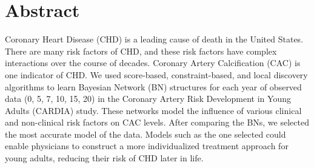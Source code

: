 \section{Abstract}
\begin{comment}


We created a Bayesian Network that models and tracks human behavior.  The data set that we used consists of health records from 5,115 black and white, males and females, ages 18-30, called CARDIA data.\cite{Friedman1988}  Using the CARDIA data we were able to track behavioral changes amongst patients, through the implementation of our Bayesian Network.  Our Network then, modeled these changes and made statistical inferences based off different attributes within our network.  These inferences can aid physicians in building a patient specific decision support model. Hospitals can then use these decision support models to produce a more personalized medical approach for treating their patients.
\end{comment}


Coronary Heart Disease (CHD) is a leading cause of death in the United States. There are many risk factors of CHD, and these risk factors have complex interactions over the course of decades. Coronary Artery Calcification (CAC) is one indicator of CHD. We used score-based, constraint-based, and local discovery algorithms to learn Bayesian Network (BN) structures for each year of observed data (0, 5, 7, 10, 15, 20) in the Coronary Artery Risk Development in Young Adults (CARDIA) study. These networks model the influence of various clinical and non-clinical risk factors on CAC levels. After comparing the BNs, we selected the most accurate model of the data. Models such as the one selected could enable physicians to construct a more individualized treatment approach for young adults, reducing their risk of CHD later in life.  





